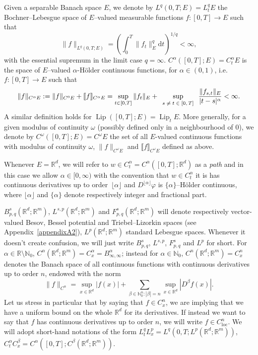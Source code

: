 \documentclass[10pt]{article}
\newcommand{\assign}{:=}
\newcommand{\mathd}{\mathrm{d}}
\newcommand{\tmem}[1]{{\em #1\/}}
\newcommand{\tmop}[1]{\ensuremath{\operatorname{#1}}}
\newcommand{\tmscript}[1]{\text{\scriptsize{$#1$}}}
\begin{document}
Given a separable Banach space $E$, we denote by $L^q (0, T ; E) = L^q_t E$
the Bochner--Lebesgue space of $E$--valued measurable functions $f : [0, T]
\rightarrow E$ such that
\[ \| f \|_{L^q (0, T ; E)} = \left( \int_0^T \| f_t \|_E^q \mathd t
   \right)^{1 / q} < \infty, \]
with the essential supremum in the limit case $q = \infty$. $C^{\alpha} ([0,
T] ; E) = C^{\alpha}_t E$ is the space of $E$--valued $\alpha$-H\"{o}lder
continuous functions, for $\alpha \in (0, 1)$, i.e. $f : [0, T] \rightarrow E$
such that
\[ \| f \|_{C^{\alpha} E} \assign \| f \|_{C^0 E} + \llbracket f
   \rrbracket_{C^{\alpha} E} = \sup_{t \in [0, T]} \| f_t \|_E +
   \sup_{\tmscript{\begin{array}{c}
     s \neq t \in [0, T]
   \end{array}}} \frac{\| f_{s, t} \|_E}{| t - s |^{\alpha}} < \infty . \]
A similar definition holds for $\tmop{Lip} ([0, T] ; E) = \tmop{Lip}_t E$.
More generally, for a given modulus of continuity $\omega$ (possibly defined
only in a neighbourhood of $0$), we denote by $C^{\omega} ([0, T] ; E) =
C^{\omega} E$ the set of all $E$-valued continuous functions with modulus of
continuity $\omega$, $\| f \|_{C^{\omega} E}$ and $\llbracket f
\rrbracket_{C^{\omega} E}$ defined as above.

Whenever $E =\mathbb{R}^d$, we will refer to $w \in C^{\alpha}_t = C^{\alpha}
([0, T] ; \mathbb{R}^d)$ as a {\tmem{path}} and in this case we allow $\alpha
\in [0, \infty)$ with the convention that $w \in C_t^{\alpha}$ it is has
continuous derivatives up to order~$\lfloor \alpha \rfloor$ and $D^{\lfloor
\alpha \rfloor} \varphi$ is $\{ \alpha \}$--H\"{o}lder continuous, where
$\lfloor \alpha \rfloor$ and $\{ \alpha \}$ denote respectively integer and
fractional part.

$B^s_{p, q} (\mathbb{R}^d ; \mathbb{R}^m)$, $L^{s, p} (\mathbb{R}^d ;
\mathbb{R}^m)$ and $F^s_{p, q} (\mathbb{R}^d ; \mathbb{R}^m)$ will denote
respectively vector\mbox{-}valued Besov, Bessel potential and
Triebel--Lizorkin spaces (see Appendix~\ref{appendixA2}), $L^p (\mathbb{R}^d ;
\mathbb{R}^m)$ standard Lebesgue spaces. Whenever it doesn't create confusion,
we will just write $B^s_{p, q}$, $L^{s, p}$, $F^s_{p, q}$ and $L^p$ for short.
For $\alpha \in \mathbb{R} \setminus \mathbb{N}_0$, $C^{\alpha} (\mathbb{R}^d
; \mathbb{R}^m) = C^{\alpha}_x = B^{\alpha}_{\infty, \infty}$; instead for
$\alpha \in \mathbb{N}_0$, $C^n (\mathbb{R}^d ; \mathbb{R}^m) = C^n_x$ denotes
the Banach space of all continuous functions with continuous derivatives up to
order $n$, endowed with the norm
\[ \| f \|_{C^{\alpha}} = \sup_{x \in \mathbb{R}^d} | f (x) | + \sum_{\beta
   \in \mathbb{N}_0^n : | \beta | = n} \sup_{x \in \mathbb{R}^d} | D^{\beta} f
   (x) | . \]
Let us stress in particular that by saying that $f \in C^n_x$, we are implying
that we have a uniform bound on the whole $\mathbb{R}^d$ for its derivatives.
If instead we want to say that $f$ has continuous derivatives up to order $n$,
we will write $f \in C^n_{\tmop{loc}}$. We will adopt short-hand notations of
the form $L^q_t L^p_x = L^q (0, T ; L^p (\mathbb{R}^d ; \mathbb{R}^m))$,
$C^{\alpha}_t C^{\beta}_x = C^{\alpha} ([0, T] ; C^{\beta} (\mathbb{R}^d ;
\mathbb{R}^m))$.
\end{document}
